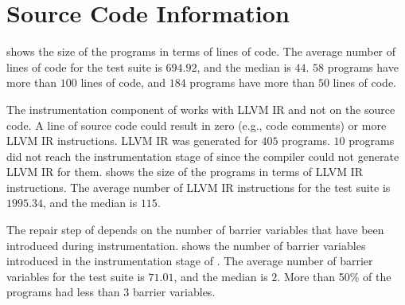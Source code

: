 \section{Source Code Information}
 shows the size of the programs in terms of lines of code. The average number of lines of code for the test suite is $694.92$, and the median is $44$. $58$ programs have more than $100$ lines of code, and $184$ programs have more than $50$ lines of code.



The instrumentation component of \tool works with LLVM IR and not on the source code. A line of source code could result in zero (e.g., code comments) or more LLVM IR instructions. LLVM IR was generated for $405$ programs. $10$ programs did not reach the instrumentation stage of \tool since the compiler could not generate LLVM IR for them.  shows the size of the programs in terms of LLVM IR instructions. The average number of LLVM IR instructions for the test suite is $1995.34$, and the median is $115$.



The repair step of \tool depends on the number of barrier variables that have been introduced during instrumentation.  shows the number of barrier variables introduced in the instrumentation stage of \tool. The average number of barrier variables for the test suite is $71.01$, and the median is $2$. More than 50\% of the programs had less than 3 barrier variables.

